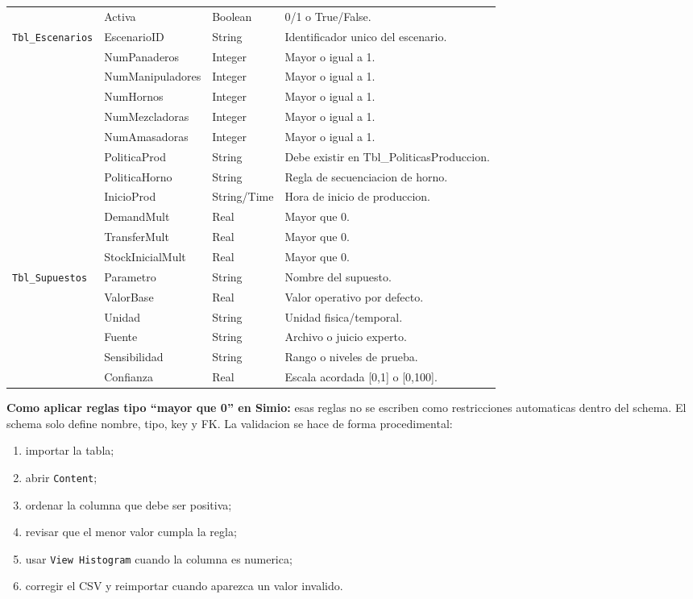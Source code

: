 \documentclass[11pt]{article}
\newcommand{\simio}[1]{\texttt{#1}}
\newcommand{\tabla}[1]{\texttt{#1}}
\begin{document}
{\begin{longtable}{L{4.2cm}L{3.0cm}L{1.9cm}L{4.7cm}}
 & Activa & Boolean & 0/1 o True/False. \\
\tabla{Tbl\_Escenarios} & EscenarioID & String & Identificador unico del escenario. \\
 & NumPanaderos & Integer & Mayor o igual a 1. \\
 & NumManipuladores & Integer & Mayor o igual a 1. \\
 & NumHornos & Integer & Mayor o igual a 1. \\
 & NumMezcladoras & Integer & Mayor o igual a 1. \\
 & NumAmasadoras & Integer & Mayor o igual a 1. \\
 & PoliticaProd & String & Debe existir en Tbl\_PoliticasProduccion. \\
 & PoliticaHorno & String & Regla de secuenciacion de horno. \\
 & InicioProd & String/Time & Hora de inicio de produccion. \\
 & DemandMult & Real & Mayor que 0. \\
 & TransferMult & Real & Mayor que 0. \\
 & StockInicialMult & Real & Mayor que 0. \\
\tabla{Tbl\_Supuestos} & Parametro & String & Nombre del supuesto. \\
 & ValorBase & Real & Valor operativo por defecto. \\
 & Unidad & String & Unidad fisica/temporal. \\
 & Fuente & String & Archivo o juicio experto. \\
 & Sensibilidad & String & Rango o niveles de prueba. \\
 & Confianza & Real & Escala acordada [0,1] o [0,100]. \\
\bottomrule
\end{longtable}
}

\textbf{Como aplicar reglas tipo ``mayor que 0'' en Simio:} esas reglas no se escriben como restricciones automaticas dentro del schema. El schema solo define nombre, tipo, key y FK. La validacion se hace de forma procedimental:
\begin{enumerate}
  \item importar la tabla;
  \item abrir \simio{Content};
  \item ordenar la columna que debe ser positiva;
  \item revisar que el menor valor cumpla la regla;
  \item usar \simio{View Histogram} cuando la columna es numerica;
  \item corregir el CSV y reimportar cuando aparezca un valor invalido.
\end{enumerate}
\end{document}
